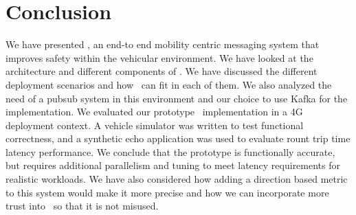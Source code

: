 \section{Conclusion}

We have presented \name, an end-to end mobility centric messaging
system that improves safety within the vehicular environment. We have
looked at the architecture and different components of \name. We
have discussed the different deployment scenarios and how \name~can
fit in each of them. We also analyzed the need of a pubsub system in
this environment and our choice to use Kafka for the
implementation. We evaluated our prototype \name~implementation in a
4G deployment context. A vehicle simulator was written to test
functional correctness, and a synthetic echo application was used to
evaluate rount trip time latency performance. We conclude that the
prototype is functionally accurate, but requires additional
parallelism and tuning to meet latency requirements for realistic
workloads. We have also considered how adding a direction based metric
to this system would make it more precise and how we can incorporate
more trust into \name~so that it is not misused.
